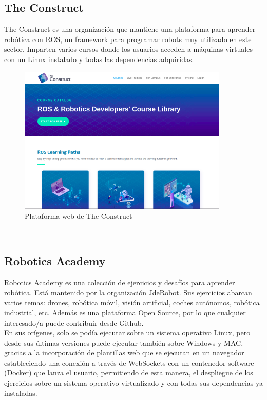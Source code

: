 \subsection{The Construct}
\label{sec:the_construct}
The Construct es una organización que mantiene una plataforma para aprender robótica con ROS, un framework para programar robots muy utilizado en este sector. Imparten varios cursos donde los usuarios acceden a máquinas virtuales con un Linux instalado y todas las dependencias adquiridas.\\

\begin{figure}[H]
  \begin{center}
    \includegraphics[width=10cm]{imagenes/cap1/the-construct.png}
  \end{center}
  \caption[Plataforma web de The Construct]{Plataforma web de The Construct\cite{the-construct}}
  \label{fig:the-construct}
\end{figure}\

\subsection{Robotics Academy}
\label{sec:robotics_academy}
Robotics Academy \cite{robotics-academy} es una colección de ejercicios y desafíos para aprender robótica. Está mantenido por la organización JdeRobot. Sus ejercicios abarcan varios temas: drones, robótica móvil, visión artificial, coches autónomos, robótica industrial, etc. Además es una plataforma Open Source, por lo que cualquier interesado/a puede contribuir desde Github.\\

En sus orígenes, solo se podía ejecutar sobre un sistema operativo Linux, pero desde sus últimas versiones puede ejecutar también sobre Windows y MAC, gracias a la incorporación de plantillas web que se ejecutan en un navegador estableciendo una conexión a través de WebSockets con un contenedor software (Docker) que lanza el usuario, permitiendo de esta manera, el despliegue de los ejercicios sobre un sistema operativo virtualizado y con todas sus dependencias ya instaladas.\\

